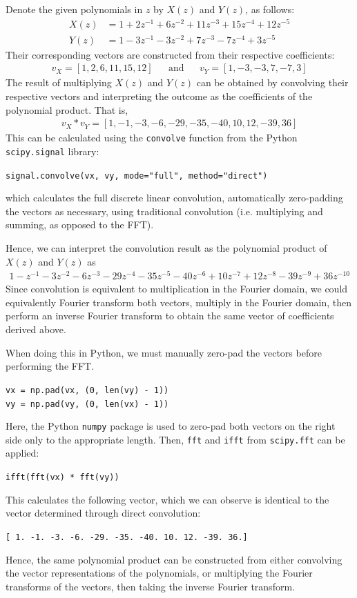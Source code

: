 \documentclass[a4paper, 11pt]{article}
\begin{document}
Denote the given polynomials in $z$ by $X(z)$ and $Y(z)$, as follows:
\begin{align*}
    X(z) &= 1 + 2z^{-1} + 6z^{-2} + 11z^{-3} + 15z^{-4} + 12z^{-5} \\
    Y(z) &= 1 - 3z^{-1} - 3z^{-2} + 7z^{-3} - 7z^{-4} + 3z^{-5}
\end{align*}
Their corresponding vectors are constructed from their respective coefficients:
\begin{align*}
    v_X = [1, 2, 6, 11, 15, 12] && \text{and} && v_Y = [1, -3, -3, 7, -7, 3]
\end{align*}
The result of multiplying $X(z)$ and $Y(z)$ can be obtained by convolving their
respective vectors and interpreting the outcome as the coefficients of the
polynomial product. That is,
\begin{align*}
    v_X \ast v_Y = [1, -1, -3, -6, -29, -35, -40, 10, 12, -39, 36]
\end{align*}
This can be calculated using the \texttt{convolve} function from the Python
\texttt{scipy.signal} library:
\begin{center}
    \texttt{signal.convolve(vx, vy, mode="full", method="direct")}
\end{center}
which calculates the full discrete linear convolution, automatically
zero-padding the vectors as necessary, using traditional convolution (i.e.
multiplying and summing, as opposed to the FFT).

Hence, we can interpret the convolution result as the polynomial product of
$X(z)$ and $Y(z)$ as
\begin{align*}
    1 - z^{-1} - 3z^{-2} - 6z^{-3} - 29z^{-4} - 35z^{-5} - 40z^{-6} + 10z^{-7} +
    12z^{-8} - 39z^{-9} + 36z^{-10}
\end{align*}
Since convolution is equivalent to multiplication in the Fourier domain, we
could equivalently Fourier transform both vectors, multiply in the Fourier
domain, then perform an inverse Fourier transform to obtain the same vector of
coefficients derived above.

When doing this in Python, we must manually zero-pad the vectors before
performing the FFT.
\begin{center}
    \texttt{vx = np.pad(vx, (0, len(vy) - 1))} \\
    \texttt{vy = np.pad(vy, (0, len(vx) - 1))}
\end{center}
Here, the Python \texttt{numpy} package is used to zero-pad both vectors on the
right side only to the appropriate length. Then, \texttt{fft} and \texttt{ifft}
from \texttt{scipy.fft} can be applied:
\begin{center}
    \texttt{ifft(fft(vx) * fft(vy))}
\end{center}
This calculates the following vector, which we can observe is identical to the
vector determined through direct convolution:
\begin{center}
    \texttt{[  1.  -1.  -3.  -6. -29. -35. -40.  10.  12. -39.  36.]}
\end{center}
Hence, the same polynomial product can be constructed from either convolving the
vector representations of the polynomials, or multiplying the Fourier transforms
of the vectors, then taking the inverse Fourier transform.
\end{document}
